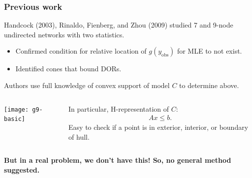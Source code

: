 \documentclass[slidestop,compress, 10pt]{beamer}
\newcommand{\yobs}{y_{\text{obs}}}
\begin{document}
%
%
\frame
{
  \frametitle{Previous work}  
Handcock (2003), Rinaldo, Fienberg, and Zhou (2009) studied 7 and 9-node undirected networks
with two statistics.
\begin{itemize}
	\item Confirmed condition for relative location of $g(\yobs)$ for MLE to not exist.  
	\item Identified cones that bound DORs.%
\end{itemize}

Authors use full knowledge of convex support of model $C$ to determine above.

\begin{columns}[]
\begin{column}[T]{0.4\textwidth}
\texttt{[image: g9-basic]}
\end{column}
\begin{column}[T]{0.6\textwidth}
In particular, H-representation of $C$:
\begin{align*}
	Ax \leq b.
\end{align*}
Easy to check if a point is in exterior, interior, or boundary of hull.

\end{column}
\end{columns}
\textbf{But in a real problem, we don't have this!  So, no general method suggested.}

}

\end{document}
